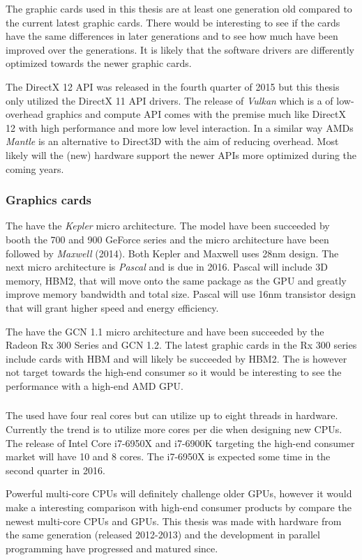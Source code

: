 The graphic cards used in this thesis are at least one generation old compared to the current latest graphic cards. There would be interesting to see if the cards have the same differences in later generations and to see how much have been improved over the generations. It is likely that the software drivers are differently optimized towards the newer graphic cards.

The DirectX 12 \gls{API} was released in the fourth quarter of 2015 but this thesis only utilized the DirectX 11 API drivers. The release of \emph{Vulkan} which is a of low-overhead graphics and compute \gls{API} comes with the premise much like DirectX 12 with high performance and more low level interaction. In a similar way AMDs \emph{Mantle} is an alternative to Direct3D with the aim of reducing overhead. Most likely will the (new) hardware support the newer APIs more optimized during the coming years.

\subsubsection{Graphics cards}

The {\NVCARD} have the \textit{Kepler} micro architecture. The model have been succeeded by booth the 700 and 900 GeForce series and the micro architecture have been followed by \textit{Maxwell} (2014). Both Kepler and Maxwell uses 28nm design. The next micro architecture is \textit{Pascal} and is due in 2016. Pascal will include 3D memory, \gls{HBM2}, that will move onto the same package as the GPU and greatly improve memory bandwidth and total size. Pascal will use 16nm transistor design that will grant higher speed and energy efficiency.

The {\AMDCARD} have the \gls{GCN} 1.1 micro architecture and have been succeeded by the Radeon Rx 300 Series and \gls{GCN} 1.2. The latest graphic cards in the Rx 300 series include cards with \gls{HBM} and will likely be succeeded by \gls{HBM2}. The {\AMDCARD} is however not target towards the high-end consumer so it would be interesting to see the performance with a high-end AMD GPU.

\subsubsection{\INTELCPU}

The used {\INTELCPU} have four real cores but can utilize up to eight threads in hardware. Currently the trend is to utilize more cores per die when designing new CPUs. The release of Intel Core i7-6950X and i7-6900K targeting the high-end consumer market will have 10 and 8 cores. The i7-6950X is expected some time in the second quarter in 2016.

Powerful multi-core \gls{CPU}s will definitely challenge older GPUs, however it would make a interesting comparison with high-end consumer products by compare the newest multi-core CPUs and GPUs. This thesis was made with hardware from the same generation (released 2012-2013) and the development in parallel programming have progressed and matured since.